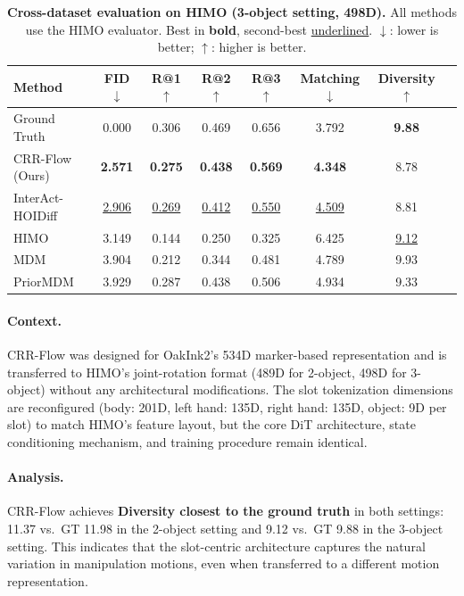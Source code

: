 \documentclass[sigconf, screen, review, anonymous]{acmart}
\begin{document}
\begin{table}[t]
  \caption{\textbf{Cross-dataset evaluation on HIMO (3-object setting, 498D).} All methods use the HIMO evaluator. Best in \textbf{bold}, second-best \underline{underlined}. $\downarrow$: lower is better; $\uparrow$: higher is better.}
  \label{tab:himo_3obj}
  \centering
  \small
  \begin{tabular}{@{}lccccccc@{}}
    \toprule
    Method & FID $\downarrow$ & R@1 $\uparrow$ & R@2 $\uparrow$ & R@3 $\uparrow$ & Matching $\downarrow$ & Diversity $\uparrow$ \\
    \midrule
    Ground Truth & 0.000 & 0.306 & 0.469 & 0.656 & 3.792 & \textbf{9.88} \\
    \midrule
    CRR-Flow (Ours) & \textbf{2.571} & \textbf{0.275} & \textbf{0.438} & \textbf{0.569} & \textbf{4.348} & 8.78 \\
    InterAct-HOIDiff & \underline{2.906} & \underline{0.269} & \underline{0.412} & \underline{0.550} & \underline{4.509} & 8.81 \\
    HIMO  & 3.149 & 0.144 & 0.250 & 0.325 & 6.425 & \underline{9.12} \\
    MDM & 3.904 & 0.212 & 0.344 & 0.481 & 4.789 & 9.93 \\
    PriorMDM & 3.929 & 0.287 & 0.438 & 0.506 & 4.934 & 9.33 \\
    \bottomrule
  \end{tabular}
\end{table}

\paragraph{Context.}
CRR-Flow was designed for OakInk2's 534D marker-based representation and is transferred to HIMO's joint-rotation format (489D for 2-object, 498D for 3-object) without any architectural modifications. The slot tokenization dimensions are reconfigured (body: 201D, left hand: 135D, right hand: 135D, object: 9D per slot) to match HIMO's feature layout, but the core DiT architecture, state conditioning mechanism, and training procedure remain identical.

\paragraph{Analysis.}
CRR-Flow achieves \textbf{Diversity closest to the ground truth} in both settings: 11.37 vs.\ GT 11.98 in the 2-object setting and 9.12 vs.\ GT 9.88 in the 3-object setting. This indicates that the slot-centric architecture captures the natural variation in manipulation motions, even when transferred to a different motion representation.
\end{document}
